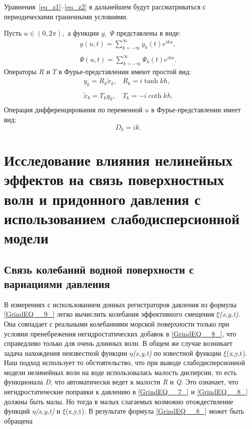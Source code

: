 Уравнения~\eqref{eq_z1}--\eqref{eq_z2} в дальнейшем будут рассматриваться с
периодическими граничными условиями.

Пусть $u\in(0,2\pi),$ а функции $y,$ $\Psi$ представлены в виде:
\begin{gather*}\label{eq_kn}
y(u,t)=\sum\limits_{k=-\infty}^{\infty}y_k(t)e^{iku},
\\
\\
\Psi(u,t)=\sum\limits_{k=-\infty}^{\infty}\Psi_k(t)e^{iku}.
\end{gather*}
Операторы $R$ и $T$ в Фурье-представлении имеют простой вид:
$$
\begin{array}{ll}
y_k=R_k \tilde x_k, & R_k=i\tanh kh, \\
\\
\tilde x_k=T_ky_k, & T_k=-i\coth kh. \\
\end{array}
$$
Операция дифференцирования по переменной $u$ в Фурье-представлении
имеет вид:
$$
D_k=ik.
$$

\section{Исследование влияния нелинейных эффектов на связь поверхностных волн и придонного давления с использованием слабодисперсионной модели}

\subsection{Связь колебаний водной поверхности с вариациями давления}

В измерениях с использованием донных регистраторов давления из формулы \eqref{GrindEQ__9_} легко вычислить колебания эффективного смещения \textit{$\xi$(x,y,t)}. Она совпадает с реальными колебаниями морской поверхности только при условии пренебрежения негидростатических добавок в \eqref{GrindEQ__8_}, что справедливо только для очень длинных волн. В общем же случае возникает задача нахождения неизвестной функции \textit{$\eta$(x,y,t)} по известной функции $\xi$(x,y,t). Наш подход использует то обстоятельство, что при выводе слабодисперсионной модели нелинейных волн на воде использовалась малость дисперсии, то есть функционала \textit{D}, что автоматически ведет к малости \textit{R} и \textit{Q}. Это означает, что негидростатические поправки к давлению в \eqref{GrindEQ__7_} и \eqref{GrindEQ__8_} должны быть малы. Но тогда в малых слагаемых возможно отождествление функций \textit{$\eta$(x,y,t)} и $\xi$(x,y,t). В результате формула \eqref{GrindEQ__8_} может быть обращена


